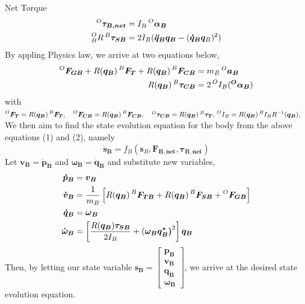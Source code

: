 Net Torque
\begin{align*}
  \prescript{O}{}{\bm{\tau_{B, net}}} &= I_B \prescript{O}{}{\bm{\alpha_B}} \\
  \prescript{O}{B}{R} \prescript{B}{}{\bm{\tau_{SB}}} &= 2I_B(\bm{\ddot{q}_B} \bm{q_B} - (\bm{\dot{q}_B} \bm{q}_B)^2)
\end{align*}
By appling Physics law, we arrive at two equations below,
\begin{align}
  \prescript{O}{}{\bm{F_{GB}}} + R(\bm{q_B}) \prescript{B}{}{\bm{F_{T}}} + R(\bm{q_B}) \prescript{B}{}{\bm{F_{CB}}} &= m_B \prescript{O}{}{\bm{{a}_B}} \\  
  R(\bm{q_B}) \prescript{B}{}{\bm{\tau_{CB}}} &= 2\prescript{O}{}{I_B}(\bm{\prescript{O}{}{\alpha_{B}}})  
\end{align}
with $\prescript{O}{}{\bm{F_{T}}} = R(\bm{q_B}) \prescript{B}{}{\bm{F_{T}}}, \quad
\prescript{O}{}{\bm{F_{CB}}} = R(\bm{q_B}) \prescript{B}{}{\bm{F_{CB}}}, \quad
\prescript{O}{}{\bm{\tau_{CB}}} = R(\bm{q_B}) \prescript{B}{}{\bm{\tau_{T}}}, \quad \\
\prescript{O}{}{I_{B}}= R(\bm{q_B}) \prescript{B}{}{I_{B}} R^{-1}(\bm{q_B}), \quad
$
We then aim to find the state evolution equation for the body from the above equations (1) and (2), namely
\begin{equation}
  \bm{\dot{s}_B} = f_B(\bm{s}_B, \bm{F_{B, net}}, \bm{\tau_{B, net}})
\end{equation}
Let $\bm{v_B} = \bm{\dot{p}_B}$ and $\bm{\omega_B} = \bm{\dot{q}_B}$ and substitute new variables,
\begin{align*}
  \bm{\dot{p}_B} &= \bm{v_B} \\
  \bm{\dot{v}_B} &= \frac{1}{m_B} \left[R(\bm{q_B})\prescript{B}{}{\bm{F_{TB}}} + R(\bm{q_B}) \prescript{B}{}{\bm{F_{SB}}} + \prescript{O}{}{\bm{F_{GB}}}\right] \\
  \bm{\dot{q}_B} &= \bm{\omega{_B}} \\
  \bm{\dot{\omega}_B} &= \left[ \frac{R(\bm{q_B}) \bm{\bm{\tau_{SB}}}}{2I_B} + {(\bm{\omega_B} \bm{{q^*_B})}}^2 \right] \bm{q_B}
\end{align*}
Then, by letting our state variable $\bm{s_B} =
\begin{bmatrix}
  \bm{p_B} \\
  \bm{v_B} \\
  \bm{q_B} \\
  \bm{\omega_B}
\end{bmatrix}
$, we arrive at the desired state evolution equation.


